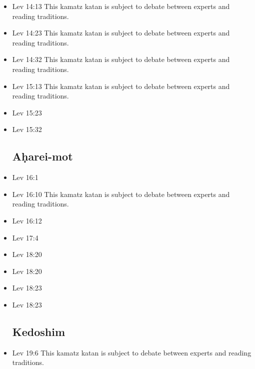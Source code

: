 \documentclass[14pt]{book}
\begin{document}
\begin{multicols}{2}
\begin{itemize}
\item Lev 14:13 This kamatz katan is subject to debate between experts and reading traditions.

\item Lev 14:23 This kamatz katan is subject to debate between experts and reading traditions.

\item Lev 14:32 This kamatz katan is subject to debate between experts and reading traditions.

\item Lev 15:13 This kamatz katan is subject to debate between experts and reading traditions.


\item Lev 15:23

\item Lev 15:32

\subsection{A\d{h}arei-mot}

\item Lev 16:1

\item Lev 16:10 This kamatz katan is subject to debate between experts and reading traditions.

\item Lev 16:12

\item Lev 17:4

\item Lev 18:20

\item Lev 18:20

\item Lev 18:23

\item Lev 18:23

\subsection{Kedoshim}

\item Lev 19:6 This kamatz katan is subject to debate between experts and reading traditions.


\end{itemize}
\end{multicols}
\end{document}
